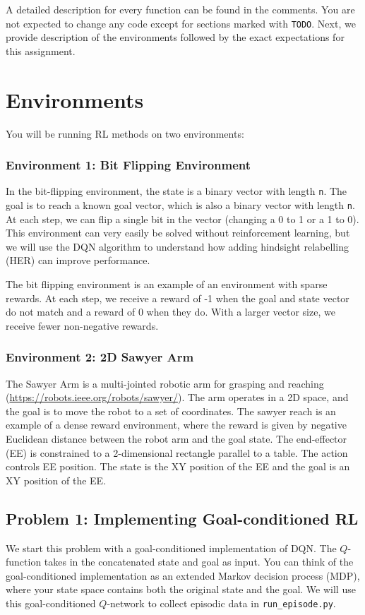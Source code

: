 \documentclass[12pt]{article}
\begin{document}
A detailed description for every function can be found in the comments. You are not expected to change any code except for sections marked with \texttt{TODO}. Next, we provide description of the environments followed by the exact expectations for this assignment.

\section*{Environments}
You will be running RL methods on two environments:

\subsubsection*{Environment 1: Bit Flipping Environment}

In the bit-flipping environment, the state is a binary vector with length \verb|n|. The goal is to reach a known goal vector, which is also a binary vector with length \verb|n|. At each step, we can flip a single bit in the vector (changing a 0 to 1 or a 1 to 0). This environment can very easily be solved without reinforcement learning, but we will use the DQN algorithm to understand how adding hindsight relabelling (HER) can improve performance.

The bit flipping environment is an example of an environment with sparse rewards. At each step, we receive a reward of -1 when the goal and state vector do not match and a reward of 0 when they do. With a larger vector size, we receive fewer non-negative rewards.

\subsubsection*{Environment 2: 2D Sawyer Arm}

The Sawyer Arm is a multi-jointed robotic arm for grasping and reaching (\url{https://robots.ieee.org/robots/sawyer/}). The arm operates in a 2D space, and the goal is to move the robot to a set of coordinates. The sawyer reach is an example of a dense reward environment, where the reward is given by negative Euclidean distance between the robot arm and the goal state. The end-effector (EE) is constrained to a 2-dimensional rectangle parallel to a table. The action controls EE position. The state is the XY position of the EE and the goal is an XY position of the EE.

\newpage

\subsection*{Problem 1: Implementing Goal-conditioned RL}
We start this problem with a goal-conditioned implementation of DQN. The $Q$-function takes in the concatenated state and goal as input. You can think of the goal-conditioned implementation as an extended Markov decision process (MDP), where your state space contains both the original state and the goal. We will use this goal-conditioned $Q$-network to collect episodic data in \texttt{run\_episode.py}.
\end{document}
